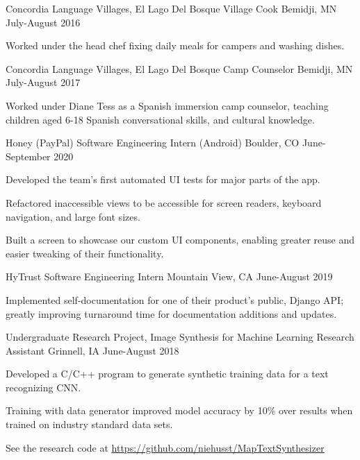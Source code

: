 \documentclass[12pt, a4paper]{awesome-cv}
\begin{document}
\begin{cventries}
\cventry
  {Concordia Language Villages, El Lago Del Bosque}
  {Village Cook}
  {Bemidji, MN}
  {July-August 2016}
  {
    \begin{cvitems}
      \item {Worked under the head chef fixing daily meals for campers and
    washing dishes.}
    \end{cvitems}
  }

  \cventry
    {Concordia Language Villages, El Lago Del Bosque}
    {Camp Counselor}
    {Bemidji, MN}
    {July-August 2017}
    {
      \begin{cvitems}
        \item {Worked under Diane Tess as a Spanish immersion camp counselor, teaching children aged 6-18 Spanish conversational skills, and cultural knowledge.}
      \end{cvitems}
    }


  \cventry
    {Honey (PayPal)}
    {Software Engineering Intern (Android)}
    {Boulder, CO}
    {June-September 2020}
    {
        \begin{cvitems}
            \item {Developed the team's first automated UI tests for major parts of the app.}
            \item {Refactored inaccessible views to be accessible for screen readers, keyboard navigation, and large font sizes.}
            \item {Built a screen to showcase our custom UI components, enabling greater reuse and easier tweaking of their functionality.}
        \end{cvitems}
    }

  \cventry
    {HyTrust}
    {Software Engineering Intern}
    {Mountain View, CA}
    {June-August 2019}
    {
      \begin{cvitems}
	\item {Implemented self-documentation for one of their product's public, Django API; greatly improving turnaround time for documentation additions and updates.}
      \end{cvitems}
    }


  \cventry
    {Undergraduate Research Project, Image Synthesis for Machine Learning}
    {Research Assistant}
    {Grinnell, IA}
    {June-August 2018}
    {
      \begin{cvitems}
        \item {Developed a C/C++ program to generate synthetic training data for a text recognizing CNN.}
        \item{Training with data generator improved model accuracy by 10\% over results when trained on industry standard data sets.}
	\item{See the research code at \underline{\href{https://github.com/niehusst/MapTextSynthesizer}{https://github.com/niehusst/MapTextSynthesizer}}}
      \end{cvitems}
    }



\end{cventries}
\end{document}
